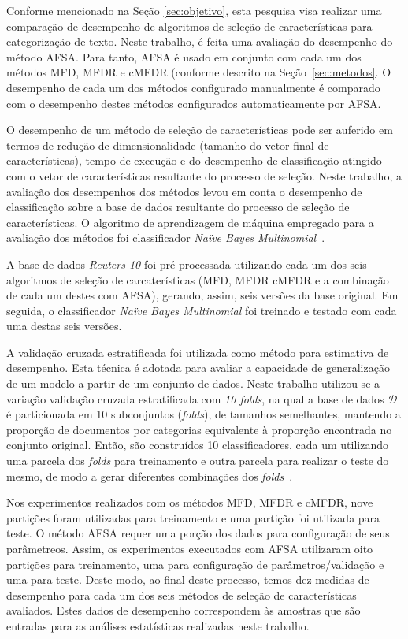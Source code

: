 \documentclass[conference]{IEEEtran}
\begin{document}
Conforme mencionado na Seção \ref{sec:objetivo}, esta pesquisa visa realizar uma comparação de desempenho de algoritmos de seleção de características para categorização de texto.
Neste trabalho, é feita uma avaliação do desempenho do método AFSA. Para tanto, AFSA é usado em conjunto com cada um dos métodos MFD, MFDR e cMFDR (conforme descrito na Seção~\ref{sec:metodos}. O desempenho de cada um dos métodos configurado manualmente é comparado com o desempenho destes métodos configurados automaticamente por AFSA.

O desempenho de um método de seleção de características pode ser auferido em termos de redução de dimensionalidade (tamanho do vetor final de características), tempo de execução e do desempenho de classificação atingido com o vetor de características resultante do processo de seleção. Neste trabalho, a avaliação dos desempenhos dos métodos levou em conta o desempenho de classificação sobre a base de dados resultante do processo de seleção de características. O algoritmo de aprendizagem de máquina empregado para a avaliação dos métodos foi classificador \textit{Na\"ive Bayes Multinomial}~\cite{mccallum1998comparison}. 

A base de dados \textit{Reuters 10} foi pré-processada utilizando cada um dos seis algoritmos de seleção de carcaterísticas (MFD, MFDR cMFDR e a combinação de cada um destes com AFSA), gerando, assim, seis versões da base original. Em seguida, o classificador \textit{Na\"ive Bayes Multinomial} foi treinado e testado com cada uma destas seis versões.

A validação cruzada estratificada foi utilizada como método para estimativa de desempenho.
Esta técnica é adotada para avaliar a capacidade de generalização de um modelo a partir de um conjunto de dados.
Neste trabalho utilizou-se a variação validação cruzada estratificada com \emph{10 folds}, na qual a base de dados $\mathcal{D}$ é particionada em 10 subconjuntos (\emph{folds}), de tamanhos semelhantes, mantendo a proporção de documentos por categorias equivalente à proporção encontrada no conjunto original. Então, são construídos 10 classificadores, cada um utilizando uma parcela dos \emph{folds} para treinamento e outra parcela para realizar o teste do mesmo, de modo a gerar diferentes combinações dos \emph{folds}~\cite{kohavi1995study}.

Nos experimentos realizados com os métodos MFD, MFDR e cMFDR, nove partições foram utilizadas para treinamento e uma partição foi utilizada para teste.
O método AFSA requer uma porção dos dados para configuração de seus parâmetreos. Assim, os experimentos executados com AFSA utilizaram oito partições para treinamento, uma para configuração de parâmetros/validação e uma para teste.
Deste modo, ao final deste processo, temos dez medidas de desempenho para cada um dos seis métodos de seleção de características avaliados.
Estes dados de desempenho correspondem às amostras que são entradas para as análises estatísticas realizadas neste trabalho.
\end{document}
